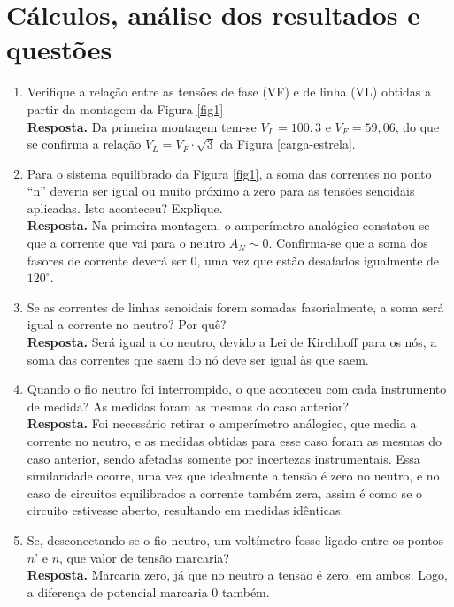 \documentclass[a4paper,12pt,oneside,openany,table,xcdraw]{article}
\begin{document}
\section{Cálculos, análise dos resultados e questões} %
\begin{enumerate}[1)]
\item Verifique a relação entre as tensões de fase (VF)  e de linha (VL) obtidas a partir da montagem da Figura \ref{fig1}\\
\textbf{Resposta.} Da primeira montagem tem-se $V_L=100,3$ e $V_F=59,06$, do que se confirma a relação $V_L=V_F\cdot\sqrt{3}$ da Figura \ref{carga-estrela}.

\item Para o sistema equilibrado da Figura \ref{fig1}, a soma das correntes no ponto “n” deveria ser igual ou muito próximo a zero para as tensões senoidais aplicadas. Isto aconteceu? Explique. \\
\textbf{Resposta.} Na primeira montagem, o amperímetro analógico constatou-se que a corrente que vai para o neutro $A_N\sim 0$. Confirma-se que a soma dos fasores de corrente deverá ser 0, uma vez que estão desafados igualmente de $120^\circ$.

\item Se as correntes de linhas senoidais forem somadas fasorialmente, a soma será
igual a corrente no neutro? Por quê? \\
\textbf{Resposta.} Será igual a do neutro, devido a Lei de Kirchhoff para os nós, a soma das correntes que saem do nó deve ser igual às que saem.

\item Quando o fio neutro foi interrompido, o que aconteceu com cada instrumento de
medida? As medidas foram as mesmas do caso anterior? \\
\textbf{Resposta.} Foi necessário retirar o amperímetro análogico, que media a corrente no neutro, e as medidas obtidas para esse caso foram as mesmas do caso anterior, sendo afetadas somente por incertezas instrumentais. Essa similaridade ocorre, uma vez que idealmente a tensão é zero no neutro, e no caso de circuitos equilibrados a corrente também zera, assim é como se o circuito estivesse aberto, resultando em medidas idênticas.

\item Se, desconectando-se o fio neutro, um voltímetro fosse ligado entre os pontos $n’$ e
$n$, que valor de tensão marcaria?\\
\textbf{Resposta.} Marcaria zero, já que no neutro a tensão é zero, em ambos. Logo, a diferença de potencial marcaria 0 também.


\end{enumerate}
\end{document}
